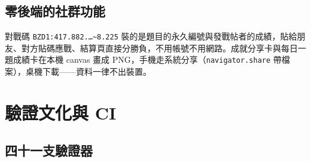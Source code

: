 \documentclass[11pt,a4paper,oneside]{report}
\renewcommand{\_}{\ifmmode\origunderscore\else\textunderscore\allowbreak\fi}
\newcommand{\code}[1]{\texttt{#1}}
\begin{document}
\section{零後端的社群功能}
對戰碼 \code{BZD1:417.882.…\textasciitilde 8.225} 裝的是題目的永久編號與發戰帖者的成績，貼給朋友、對方貼碼應戰、結算頁直接分勝負，不用帳號不用網路。成就分享卡與每日一題成績卡在本機 canvas 畫成 PNG，手機走系統分享（\code{navigator.share} 帶檔案），桌機下載——資料一律不出裝置。

\chapter{驗證文化與 CI}
\section{四十一支驗證器}
\end{document}
